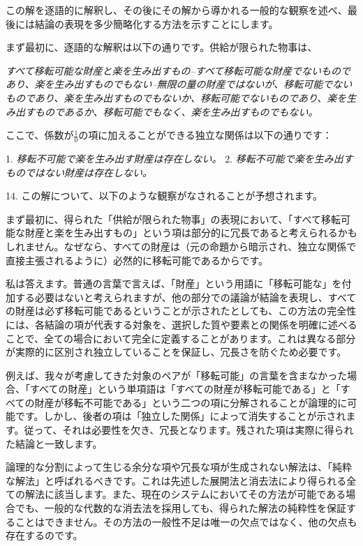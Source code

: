\documentclass[a4paper,11pt,openany]{ltjsbook}
\begin{document}
この解を逐語的に解釈し、その後にその解から導かれる一般的な観察を述べ、最後には結論の表現を多少簡略化する方法を示すことにします。

まず最初に、逐語的な解釈は以下の通りです。供給が限られた物事は、

\textit{すべて移転可能な財産と楽を生み出すもの--すべて移転可能な財産でないものであり、楽を生み出すものでもない--無限の量の財産ではないが、移転可能でないものであり、楽を生み出すものでもないか、移転可能でないものであり、楽を生み出すものであるか、移転可能でもなく、楽を生み出すものでもない。}

ここで、係数が$\frac{1}{0}$の項に加えることができる独立な関係は以下の通りです：

1. \textit{移転不可能で楽を生み出す財産は存在しない。}
2. \textit{移転不可能で楽を生み出すものではない財産は存在しない。}

14. この解について、以下のような観察がなされることが予想されます。

まず最初に、得られた「供給が限られた物事」の表現において、「すべて移転可能な財産と楽を生み出すもの」という項は部分的に冗長であると考えられるかもしれません。なぜなら、すべての財産は（元の命題から暗示され、独立な関係で直接主張されるように）必然的に移転可能であるからです。

私は答えます。普通の言葉で言えば、「財産」という用語に「移転可能な」を付加する必要はないと考えられますが、他の部分での議論が結論を表現し、すべての財産は必ず移転可能であるということが示されたとしても、この方法の完全性には、各結論の項が代表する対象を、選択した質や要素との関係を明確に述べることで、全ての場合において完全に定義することがあります。これは異なる部分が実際的に区別され独立していることを保証し、冗長さを防ぐため必要です。

例えば、我々が考慮してきた対象のペアが「移転可能」の言葉を含まなかった場合、「すべての財産」という単項語は「すべての財産が移転可能である」と「すべての財産が移転不可能である」という二つの項に分解されることが論理的に可能です。しかし、後者の項は「独立した関係」によって消失することが示されます。従って、それは必要性を欠き、冗長となります。残された項は実際に得られた結論と一致します。

論理的な分割によって生じる余分な項や冗長な項が生成されない解法は、「純粋な解法」と呼ばれるべきです。これは先述した展開法と消去法により得られる全ての解法に該当します。また、現在のシステムにおいてその方法が可能である場合でも、一般的な代数的な消去法を採用しても、得られた解法の純粋性を保証することはできません。その方法の一般性不足は唯一の欠点ではなく、他の欠点も存在するのです。
\end{document}
